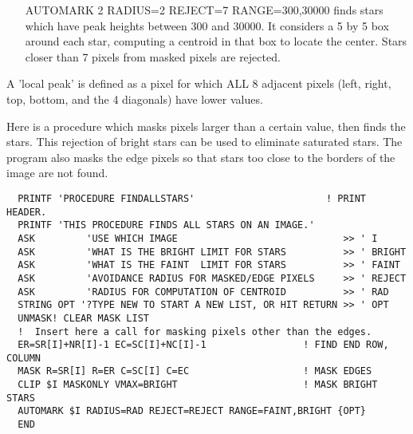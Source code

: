 \begin{itemize}
  \item[AUTOMARK 2 RADIUS=2 REJECT=7 RANGE=300,30000\hfill]{
finds stars which have peak heights between 300 and 30000.  It 
considers a 5 by 5 box around each star, computing a centroid
in that box to locate the center.  Stars closer than 7 pixels
from masked pixels are rejected.}
\end{itemize}
A 'local peak' is defined as a pixel for which ALL 8 adjacent pixels (left,
right, top, bottom, and the 4 diagonals) have lower values.

Here is a procedure which masks pixels larger than a certain value, then
finds the stars.  This rejection of bright stars can be used to eliminate
saturated stars.  The program also masks the edge pixels so that stars too
close to the borders of the image are not found.

\begin{verbatim}
  PRINTF 'PROCEDURE FINDALLSTARS'                       ! PRINT HEADER.
  PRINTF 'THIS PROCEDURE FINDS ALL STARS ON AN IMAGE.'
  ASK         'USE WHICH IMAGE                             >> ' I
  ASK         'WHAT IS THE BRIGHT LIMIT FOR STARS          >> ' BRIGHT
  ASK         'WHAT IS THE FAINT  LIMIT FOR STARS          >> ' FAINT
  ASK         'AVOIDANCE RADIUS FOR MASKED/EDGE PIXELS     >> ' REJECT
  ASK         'RADIUS FOR COMPUTATION OF CENTROID          >> ' RAD
  STRING OPT '?TYPE NEW TO START A NEW LIST, OR HIT RETURN >> ' OPT
  UNMASK! CLEAR MASK LIST
  !  Insert here a call for masking pixels other than the edges.
  ER=SR[I]+NR[I]-1 EC=SC[I]+NC[I]-1                 ! FIND END ROW, COLUMN
  MASK R=SR[I] R=ER C=SC[I] C=EC                    ! MASK EDGES
  CLIP $I MASKONLY VMAX=BRIGHT                      ! MASK BRIGHT STARS
  AUTOMARK $I RADIUS=RAD REJECT=REJECT RANGE=FAINT,BRIGHT {OPT}
  END
\end{verbatim}


